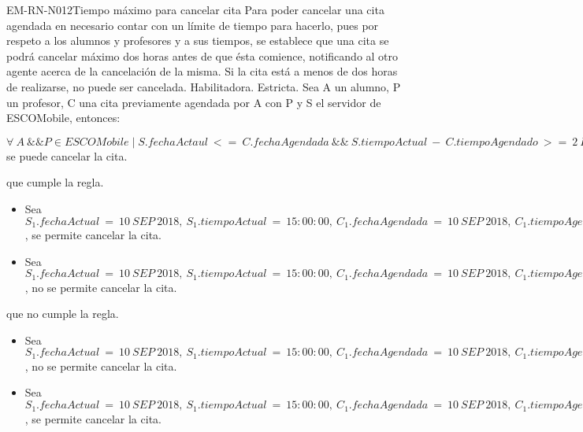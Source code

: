 \begin{BussinesRule}{EM-RN-N012}{Tiempo máximo para cancelar cita}
	\BRitem[Descripción:] Para poder cancelar una cita agendada en necesario contar con un límite de tiempo para hacerlo, pues por respeto a los alumnos y profesores y a sus tiempos, se establece que una cita se podrá cancelar máximo dos horas antes de que ésta comience, notificando al otro agente acerca de la cancelación de la misma. Si la cita está a menos de dos horas de realizarse, no puede ser cancelada.
	\BRitem[Tipo: ] Habilitadora.
	\BRitem[Nivel: ] Estricta.
	\BRitem[Sentencia : ] Sea A un alumno, P un profesor, C una cita previamente agendada por A con P y S el servidor de ESCOMobile, entonces:
	\begin{center}
		$\forall \: A \: \&\& P \in ESCOMobile \mid  S.fechaActaul \: <= \: C.fechaAgendada \: \&\& \: S.tiempoActual \: - \: C.tiempoAgendado \: >= \: 2 \: Horas \: \Rightarrow$ se puede cancelar la cita.
	\end{center}
	 que cumple la regla.
		\begin{itemize}
			\item Sea $S_{1}.fechaActual \: = \: 10 \: SEP \: 2018, \: S_{1}.tiempoActual \: = \: 15:00:00, \: C_{1}.fechaAgendada \: = \: 10 \: SEP \: 2018, \: C_{1}.tiempoAgendado \: = \: 12:00:00$, se permite
			cancelar la cita.
			\item Sea $S_{1}.fechaActual \: = \: 10 \: SEP \: 2018, \: S_{1}.tiempoActual \: = \: 15:00:00, \: C_{1}.fechaAgendada \: = \: 10 \: SEP \: 2018, \: C_{1}.tiempoAgendado \: = \: 14:00:00$, no se permite
			cancelar la cita.
		\end{itemize}
	 que no cumple la regla.
		\begin{itemize}
			\item Sea $S_{1}.fechaActual \: = \: 10 \: SEP \: 2018, \: S_{1}.tiempoActual \: = \: 15:00:00, \: C_{1}.fechaAgendada \: = \: 10 \: SEP \: 2018, \: C_{1}.tiempoAgendado \: = \: 12:00:00$, no se permite
			cancelar la cita.
			\item Sea $S_{1}.fechaActual \: = \: 10 \: SEP \: 2018, \: S_{1}.tiempoActual \: = \: 15:00:00, \: C_{1}.fechaAgendada \: = \: 10 \: SEP \: 2018, \: C_{1}.tiempoAgendado \: = \: 14:00:00$, se permite
			cancelar la cita.
		\end{itemize}

\end{BussinesRule}



